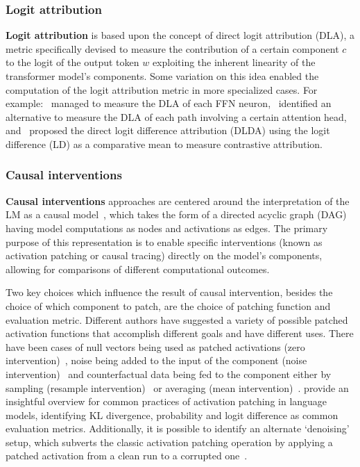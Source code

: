 \subsubsection*{Logit attribution}

\textbf{Logit attribution} is based upon the concept of direct logit attribution (DLA), a metric specifically devised to measure the contribution of a certain component $c$ to the logit of the output token $w$ exploiting the inherent linearity of the transformer model's components.
Some variation on this idea enabled the computation of the logit attribution metric in more specialized cases.
For example:~\citet{geva2022} managed to measure the DLA of each FFN neuron,~\citet{ferrando2023} identified an alternative to measure the DLA of each path involving a certain attention head, and~\citet{wang2023} proposed the direct logit difference attribution (DLDA) using the logit difference (LD) as a comparative mean to measure contrastive attribution.

\subsubsection*{Causal interventions}

\textbf{Causal interventions} approaches are centered around the interpretation of the LM as a causal model~\cite{geiger2021,mcgrath2023}, which takes the form of a directed acyclic graph (DAG) having model computations as nodes and activations as edges.
The primary purpose of this representation is to enable specific interventions (known as activation patching or causal tracing) directly on the model's components, allowing for comparisons of different computational outcomes.

Two key choices which influence the result of causal intervention, besides the choice of which component to patch, are the choice of patching function and evaluation metric.
Different authors have suggested a variety of possible patched activation functions that accomplish different goals and have different uses.
There have been cases of null vectors being used as patched activations (zero intervention)~\cite{olsson2022, mohebbi2023}, noise being added to the input of the component (noise intervention)~\cite{meng2022} and counterfactual data being fed to the component either by sampling (resample intervention)~\cite{hanna2023, conmy2023} or averaging (mean intervention)~\cite{wang2023}.
\citet{zhang2024} provide an insightful overview for common practices of activation patching in language models, identifying KL divergence, probability and logit difference as common evaluation metrics.
Additionally, it is possible to identify an alternate `denoising' setup, which subverts the classic activation patching operation by applying a patched activation from a clean run to a corrupted one~\cite{lieberum2023, meng2022}.


